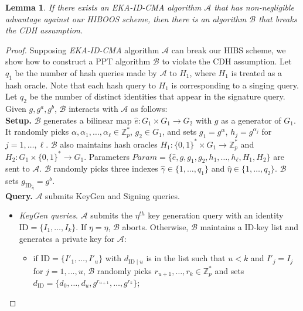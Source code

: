 \documentclass[times]{secauth}
\newtheorem{lemma}[theorem]{Lemma}
\theoremstyle{definition}
\theoremstyle{remark}
\begin{document}
\begin{lemma} \label{lemma-eps-hibs}
If there exists an EKA-ID-CMA algorithm $\mathcal{A}$ that has non-negligible advantage against our HIBOOS scheme, 
then there is an algorithm $\mathcal{B}$ that breaks the CDH assumption.
\end{lemma}
\begin{proof}
Supposing \emph{EKA-ID-CMA} algorithm $\mathcal{A}$ can break our HIBS scheme, we show how to construct a PPT algorithm $\mathcal{B}$ to violate the CDH assumption. 
Let $q_1$ be the number of hash queries made by $\mathcal{A}$ to $H_1$, where $H_1$ is treated as a hash oracle.
Note that each hash query to $H_1$ is corresponding to a singing query. 
Let $q_2$ be the number of distinct identities that appear in the signature query.
Given $g, g^a, g^b$, $\mathcal{B}$ interacts with $\mathcal{A}$ as follows:
\vspace{0.2cm}
\\
\textbf{Setup.}
$\mathcal{B}$ generates a bilinear map $\hat{e}: G_1 \times G_1 \rightarrow G_2$ with $g$ as a generator of $G_1$.
It randomly picks $\alpha, \alpha_1, \ldots, \alpha_\ell \in \mathbb{Z}^*_p$, $g_2 \in G_1$, and sets $g_1 = g^\alpha$, $h_j = g^{\alpha_j}$ for $j = 1, \ldots, \ell$.
$\mathcal{B}$ also maintains hash oracles $H_1: \{0, 1\}^* \times G_1 \rightarrow \mathbb{Z}_p^*$ and $H_2: G_1 \times \{0, 1\}^* \rightarrow G_1$.
Parameters $Param = \{\hat{e}, g, g_1,  g_2, h_1, \ldots, h_\ell, H_1, H_2\}$ are sent to $\mathcal{A}$.
$\mathcal{B}$ randomly picks three indexes $\hat{\gamma} \in \{1, \ldots, q_1\}$ and $\hat{\eta} \in \{1, \ldots, q_2\}$. 
$\mathcal{B}$ sets $g_{\mathrm{ID}_{\hat{\eta}}} = g^b$.
\vspace{0.2cm}
\\
\textbf{Query.}
$\mathcal{A}$ submits KeyGen and Signing queries.
\begin{itemize}
	\item \emph{KeyGen queries}. 
	$\mathcal{A}$ submits the $\eta^{th}$ key generation query with an identity $\mathrm{ID} = \{I_1, \ldots, I_k\}$.
	If $\eta = \hat{\eta}$, $\mathcal{B}$ aborts. 
	Otherwise,  $\mathcal{B}$ maintains a ID-key list and generates a private key for $\mathcal{A}$: 
	\begin{itemize}
		\item if $\mathrm{ID} = \{I'_1, \ldots, I'_u\}$ with $d_{\mathrm{ID}\mid u}$ is in the list such that $u < k$ and $I'_j = I_j$ for $j = 1, \ldots, u$, $\mathcal{B}$ randomly picks $r_{u+1}, \ldots, r_k \in \mathbb{Z}_p^*$ and sets $d_{\mathrm{ID}} = \{d_0, \ldots, d_u, g^{r_{u+1}}, \ldots, g^{r_k}\}$;

\end{itemize}
\end{itemize}
\end{proof}
\end{document}
